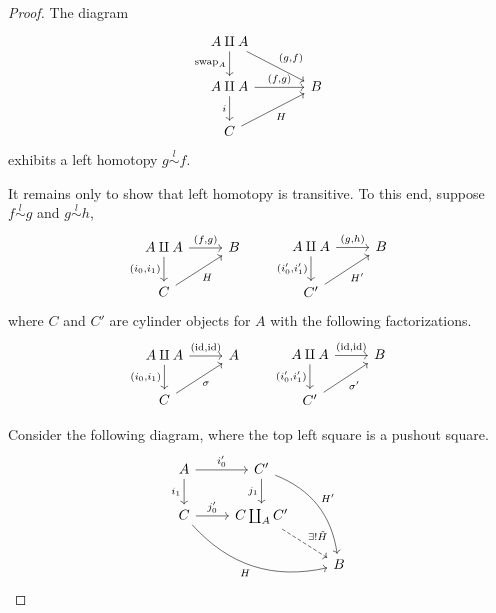 \documentclass[main.tex]{subfiles}
\begin{document}
\begin{proof}
  The diagram
  \begin{equation*}
    \begin{tikzcd}[column sep=large]
      A \amalg A
      \arrow[d, swap, "\mathrm{swap}_{A}"]
      \arrow[dr, "{(g, f)}"]
      \\
      A \amalg A
      \arrow[r, "{(f, g)}"]
      \arrow[d, swap, "i"]
      & B
      \\
      C
      \arrow[ur, swap, "H"]
    \end{tikzcd}
  \end{equation*}
  exhibits a left homotopy $g \overset{l}{\sim} f$.

  It remains only to show that left homotopy is transitive. To this end, suppose $f \overset{l}{\sim} g$ and $g \overset{l}{\sim} h$,
  \begin{equation*}
    \begin{tikzcd}
      A \amalg A
      \arrow[r, "{(f, g)}"]
      \arrow[d, swap, "{(i_{0}, i_{1})}"]
      & B
      \\
      C
      \arrow[ur, swap, "H"]
    \end{tikzcd}
    \qquad
    \begin{tikzcd}
      A \amalg A
      \arrow[r, "{(g, h)}"]
      \arrow[d, swap, "{(i_{0}', i_{1}')}"]
      & B
      \\
      C'
      \arrow[ur, swap, "H'"]
    \end{tikzcd}
  \end{equation*}
  where $C$ and $C'$ are cylinder objects for $A$ with the following factorizations.
  \begin{equation*}
    \begin{tikzcd}
      A \amalg A
      \arrow[r, "{(\id, \id)}"]
      \arrow[d, swap, "{(i_{0}, i_{1})}"]
      & A
      \\
      C
      \arrow[ur, swap, "\sigma"]
    \end{tikzcd}
    \qquad
    \begin{tikzcd}
      A \amalg A
      \arrow[r, "{(\id, \id)}"]
      \arrow[d, swap, "{(i_{0}', i_{1}')}"]
      & B
      \\
      C'
      \arrow[ur, swap, "\sigma'"]
    \end{tikzcd}
  \end{equation*}

  Consider the following diagram, where the top left square is a pushout square.
  \begin{equation*}
    \begin{tikzcd}
      A
      \arrow[r, "i_{0}'"]
      \arrow[d, swap, "i_{1}"]
      & C'
      \arrow[d, swap, "j_{1}"]
      \arrow[ddr, bend left, "H'"]
      \\
      C
      \arrow[r, "j_{0}'"]
      \arrow[drr, swap, bend right, "H"]
      & C \coprod_{A} C'
      \arrow[dr, dashed, "\exists!\tilde{H}"]
      \\
      && B
    \end{tikzcd}
  \end{equation*}


\end{proof}
\end{document}
